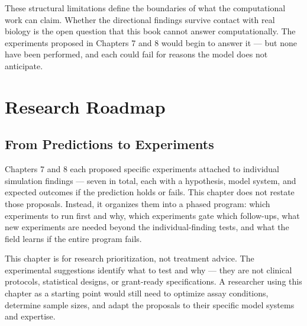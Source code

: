 \documentclass[11pt,twoside,openright]{report}
\begin{document}
These structural limitations define the boundaries of what the computational work can claim. Whether the directional findings survive contact with real biology is the open question that this book cannot answer computationally. The experiments proposed in Chapters 7 and 8 would begin to answer it --- but none have been performed, and each could fail for reasons the model does not anticipate.



\chapter{Research Roadmap}


\section{From Predictions to Experiments}


Chapters 7 and 8 each proposed specific experiments attached to individual simulation findings --- seven in total, each with a hypothesis, model system, and expected outcomes if the prediction holds or fails. This chapter does not restate those proposals. Instead, it organizes them into a phased program: which experiments to run first and why, which experiments gate which follow-ups, what new experiments are needed beyond the individual-finding tests, and what the field learns if the entire program fails.

This chapter is for research prioritization, not treatment advice. The experimental suggestions identify what to test and why --- they are not clinical protocols, statistical designs, or grant-ready specifications. A researcher using this chapter as a starting point would still need to optimize assay conditions, determine sample sizes, and adapt the proposals to their specific model systems and expertise.
\end{document}
